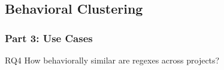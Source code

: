\subsection{Behavioral Clustering}
\begin{frame}
\frametitle{Part 3: Use Cases}

\begin{block}{RQ4}
How behaviorally similar are regexes across projects?
\end{block}
\end{frame}

%


%

